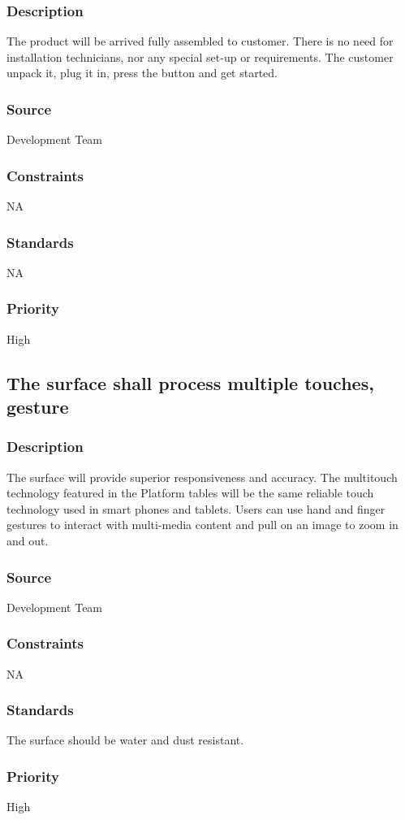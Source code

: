 \subsubsection{Description}
The product will be arrived fully assembled to customer. There is no need for installation technicians, nor any special set-up or requirements. The customer unpack it, plug it in, press the button and get started.
\subsubsection{Source}
Development Team
\subsubsection{Constraints}
NA
\subsubsection{Standards}
NA
\subsubsection{Priority}
High

\subsection{The surface shall process multiple touches, gesture }
\subsubsection{Description}
The surface will provide superior responsiveness and accuracy. The multitouch technology featured in the Platform tables will be the same reliable touch technology used in smart phones and tablets. Users can use hand and finger gestures to interact with multi-media content and pull on an image to zoom in and out.  
\subsubsection{Source}
Development Team
\subsubsection{Constraints}
NA
\subsubsection{Standards}
The surface should be water and dust resistant.
\subsubsection{Priority}
High

